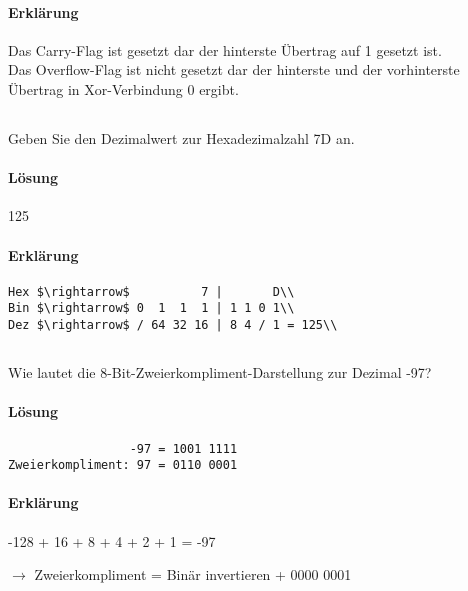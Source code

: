 \paragraph{Erklärung}
Das Carry-Flag ist gesetzt dar der hinterste Übertrag auf 1 gesetzt ist.\\
Das Overflow-Flag ist nicht gesetzt dar der hinterste und der vorhinterste Übertrag in Xor-Verbindung 0 ergibt.\\

\subsection{}

Geben Sie den Dezimalwert zur Hexadezimalzahl 7D an.

\paragraph{Lösung}
125

\paragraph{Erklärung}
\begin{lstlisting}
Hex $\rightarrow$          7 |       D\\
Bin $\rightarrow$ 0  1  1  1 | 1 1 0 1\\
Dez $\rightarrow$ / 64 32 16 | 8 4 / 1 = 125\\
\end{lstlisting}

\subsection{}

Wie lautet die 8-Bit-Zweierkompliment-Darstellung zur Dezimal -97?

\paragraph{Lösung}
\begin{lstlisting}
                 -97 = 1001 1111
Zweierkompliment: 97 = 0110 0001
\end{lstlisting}


\paragraph{Erklärung}
-128 + 16 + 8 + 4 + 2 + 1 = -97

$\rightarrow$ Zweierkompliment = Binär invertieren + 0000 0001

